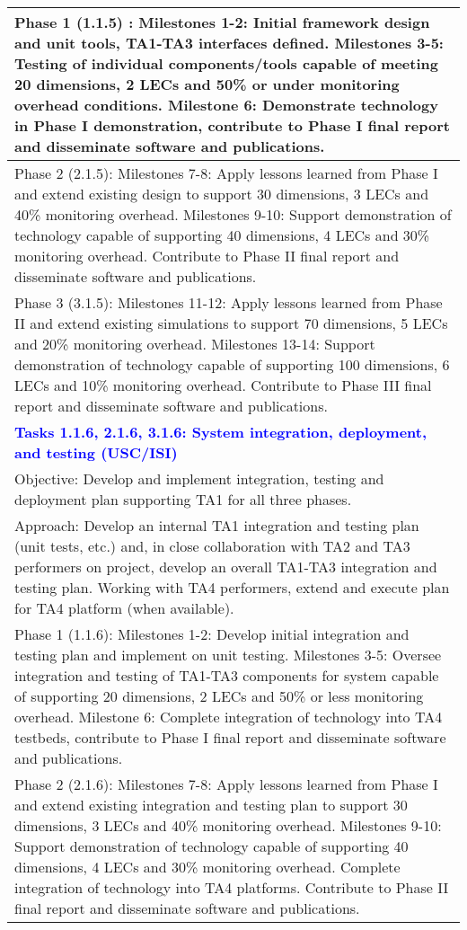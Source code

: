 {\begin{longtable} {|p{\textwidth} | }
Phase 1 (1.1.5) : Milestones 1-2:  Initial framework design and unit tools, TA1-TA3 interfaces defined. Milestones 3-5:  Testing of individual components/tools capable of meeting 20 dimensions, 2 LECs and 50\% or under monitoring overhead conditions.   Milestone 6: Demonstrate technology in Phase I demonstration, contribute to Phase I final report and disseminate software and publications. \\ \hline
Phase 2 (2.1.5): Milestones 7-8:  Apply lessons learned from Phase I and extend existing design to support 30 dimensions, 3 LECs and 40\% monitoring overhead.  Milestones 9-10:  Support demonstration of technology capable of supporting 40 dimensions, 4 LECs and 30\% monitoring overhead.  Contribute to Phase II final report and disseminate software and publications. \\ \hline
Phase 3 (3.1.5): Milestones 11-12:  Apply lessons learned from Phase II and extend existing simulations to support 70 dimensions, 5 LECs and 20\% monitoring overhead.  Milestones 13-14:  Support demonstration of technology capable of supporting 100 dimensions, 6 LECs and 10\% monitoring overhead.  Contribute to Phase III final report and disseminate software and publications. \\ \hline
\textcolor{blue} {\footnotesize {\textbf{Tasks 1.1.6, 2.1.6, 3.1.6: System integration, deployment, and testing (USC/ISI)}}} \\ \hline
Objective: Develop and implement integration, testing and deployment plan supporting TA1 for all three phases. \\ \hline
Approach: Develop an internal TA1 integration and testing plan (unit tests, etc.) and, in close collaboration with TA2 and TA3 performers on project, develop an overall TA1-TA3 integration and testing plan.  Working with TA4 performers, extend and execute plan for TA4 platform (when available). \\ \hline
Phase 1 (1.1.6): Milestones 1-2:  Develop initial integration and testing plan and implement on unit testing.  Milestones 3-5:  Oversee integration and testing of TA1-TA3 components for system capable of supporting 20 dimensions, 2 LECs and 50\% or less monitoring overhead.   Milestone 6: Complete integration of technology into TA4 testbeds, contribute to Phase I final report and disseminate software and publications. \\ \hline
Phase 2 (2.1.6): Milestones 7-8:  Apply lessons learned from Phase I and extend existing integration and testing plan to support 30 dimensions, 3 LECs and 40\% monitoring overhead.  Milestones 9-10:  Support demonstration of technology capable of supporting 40 dimensions, 4 LECs and 30\% monitoring overhead.  Complete integration of technology into TA4 platforms.  Contribute to Phase II final report and disseminate software and publications. \\ \hline

\end{longtable}}
